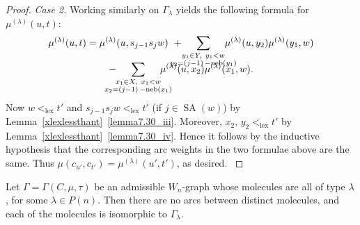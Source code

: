 \documentclass[ALCO,ThmDefs,Unicode,epreuves]{cedram}
\newenvironment{Case}[1]{\smallskip\noindent\emph{Case #1}\endgraf
 \nobreak\noindent\ignorespaces}{\endgraf\smallskip}
\DeclareMathOperator{\lex}{lex}
\DeclareMathOperator{\neb}{-neb}
\DeclareMathOperator{\SA}{SA}
\begin{document}
\begin{proof}
\begin{Case}{2.}
Working similarly on $\Gamma_{\lambda}$ yields the following formula for $\mu^{(\lambda)}(u,t)$:
\begin{multline*}
\mu^{(\lambda)}(u,t)=\mu^{(\lambda)}(u,s_{j-1}s_{j}w)\,\,+\mskip -25mu
\sum_{\substack{y_1\in Y,\ y_1<w\\y_2=(j-1)\neb(y_1)}}\mskip -25mu
\mu^{(\lambda)}(u,y_{2})\mu^{(\lambda)}(y_{1},w)\\[-10pt]
-\mskip -25mu\sum_{\substack{x_1\in X,\ x_1<w\\x_2=(j-1)\neb(x_1)}}\mskip -25mu
\mu^{(\lambda)}(u,x_{2})\mu^{(\lambda)}(x_{1},w).
\end{multline*}
Now $w<_{\lex} t'$ and $s_{j-1}s_jw<_{\lex}t'$ (if $j\in\SA(w)$) by Lemma~\ref{xlexlessthant}~\ref{lemma7.30_iii}.
Moreover, $x_2,\,y_2<_{\lex}t'$ by Lemma~\ref{xlexlessthant}~\ref{lemma7.30_iv}. Hence
it follows by the inductive hypothesis that the corresponding arc weights in the two formulae
above are the same. Thus $\mu(c_{u'},c_{t'})=\mu^{(\lambda)}(u',t')$, as desired.
\qedhere
\end{Case}
\end{proof}

\begin{prop}\label{admcellaremonomol}
Let $\Gamma = \Gamma(C,\mu,\tau)$ be an admissible $W_n$-graph
whose molecules are all of type $\lambda$, for some $\lambda\in P(n)$.
Then there are no arcs between distinct molecules, and each of the molecules
is isomorphic to $\Gamma_\lambda$.
\end{prop}
\end{document}
